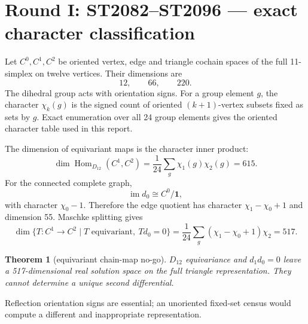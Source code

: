 \documentclass[11pt,a4paper]{article}
\newtheorem{theorem}{Theorem}\newcommand{\status}[1]{\textsf{[#1]}}
\begin{document}
\begin{abstract}
The classification can be summarized as
\[
517\xrightarrow{\rm locality}12
\xrightarrow{\rm primitive\ integral\ cells}1,
\]
where the final arrow is conditional on exactly the face/cell structure that
strict FIN has not sourced.  Pairwise kernel and 0-form Dirichlet data contain
no independent three-point face observable.  The highest-value next theorem is
therefore to derive or refute an intrinsic strict ternary cumulant/associator or
cycle observable with a $D_{12}$ transformation law, nonzero orbit witness and
refinement coherence.  Without such a new information type, unique gauge
geometry cannot emerge from the current pairwise data without assumption.
\end{abstract}

\tableofcontents\newpage

\section{Round I: ST2082--ST2096 --- exact character classification}

Let $C^0,C^1,C^2$ be oriented vertex, edge and triangle cochain spaces of the
full 11-simplex on twelve vertices.  Their dimensions are
\[
12,\qquad 66,\qquad 220.
\]
The dihedral group acts with orientation signs.  For a group element $g$, the
character $\chi_k(g)$ is the signed count of oriented $(k+1)$-vertex subsets
fixed as sets by $g$.  Exact enumeration over all 24 group elements gives the
oriented character table used in this report.

The dimension of equivariant maps is the character inner product:
\[
\dim\operatorname{Hom}_{D_{12}}(C^1,C^2)
=\frac1{24}\sum_g\chi_1(g)\chi_2(g)=615.
\]
For the connected complete graph,
\[
\operatorname{im}d_0\cong C^0/\mathbf1,
\]
with character $\chi_0-1$.  Therefore the edge quotient has character
$\chi_1-\chi_0+1$ and dimension 55.  Maschke splitting gives
\[
\dim\{T:C^1\to C^2\mid T\text{ equivariant},\ Td_0=0\}
=\frac1{24}\sum_g(\chi_1-\chi_0+1)\chi_2=517.
\]

\begin{theorem}[equivariant chain-map no-go]
$D_{12}$ equivariance and $d_1d_0=0$ leave a 517-dimensional real solution
space on the full triangle representation.  They cannot determine a unique
second differential.
\end{theorem}

Reflection orientation signs are essential; an unoriented fixed-set census
would compute a different and inappropriate representation.
\end{document}
